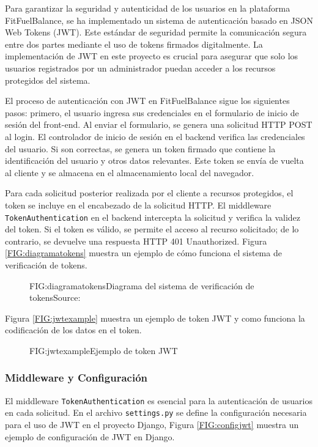 Para garantizar la seguridad y autenticidad de los usuarios en la plataforma FitFuelBalance, se ha implementado un sistema de autenticación basado en JSON Web Tokens (JWT). Este estándar de seguridad permite la comunicación segura entre dos partes mediante el uso de tokens firmados digitalmente. La implementación de JWT en este proyecto es crucial para asegurar que solo los usuarios registrados por un administrador puedan acceder a los recursos protegidos del sistema.

El proceso de autenticación con JWT en FitFuelBalance sigue los siguientes pasos: primero, el usuario ingresa sus credenciales en el formulario de inicio de sesión del front-end. Al enviar el formulario, se genera una solicitud HTTP POST al login. El controlador de inicio de sesión en el backend verifica las credenciales del usuario. Si son correctas, se genera un token firmado que contiene la identificación del usuario y otros datos relevantes. Este token se envía de vuelta al cliente y se almacena en el almacenamiento local del navegador.

Para cada solicitud posterior realizada por el cliente a recursos protegidos, el token se incluye en el encabezado de la solicitud HTTP. El middleware \texttt{TokenAuthentication} en el backend intercepta la solicitud y verifica la validez del token. Si el token es válido, se permite el acceso al recurso solicitado; de lo contrario, se devuelve una respuesta HTTP 401 Unauthorized. Figura \ref{FIG:diagramatokens} muestra un ejemplo de cómo funciona el sistema de verificación de tokens.

\begin{figure}[Diagrama Tokens]{FIG:diagramatokens}{Diagrama del sistema de verificación de tokens}{Source: \cite{jwtexample}}
\end{figure}

Figura \ref{FIG:jwtexample} muestra un ejemplo de token JWT y como funciona la codificación de los datos en el token.

\begin{figure}[Ejemplo Token]{FIG:jwtexample}{Ejemplo de token JWT}
\end{figure}

\subsubsection{Middleware y Configuración}

El middleware \texttt{TokenAuthentication} es esencial para la autenticación de usuarios en cada solicitud. En el archivo \texttt{settings.py} se define la configuración necesaria para el uso de JWT en el proyecto Django, Figura \ref{FIG:configjwt} muestra un ejemplo de configuración de JWT en Django.

